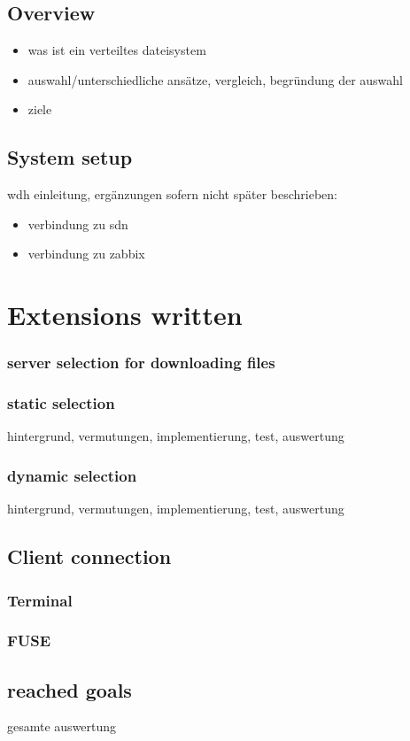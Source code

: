 
\subsection{Overview}



\begin{itemize}
\item was ist ein verteiltes dateisystem
\item auswahl/unterschiedliche ansätze, vergleich, begründung der auswahl
\item ziele
\end{itemize}

\subsection{System setup}

wdh einleitung, ergänzungen sofern nicht später beschrieben:

\begin{itemize}
\item verbindung zu sdn
\item verbindung zu zabbix
\end{itemize}

\section{Extensions written}

\subsubsection{server selection for downloading files}

\subsubsection{static selection}

hintergrund, vermutungen, implementierung, test, auswertung

\subsubsection{dynamic selection}

hintergrund, vermutungen, implementierung, test, auswertung

\subsection{Client connection}
\subsubsection{Terminal}
\subsubsection{FUSE}

\subsection{reached goals}
gesamte auswertung





